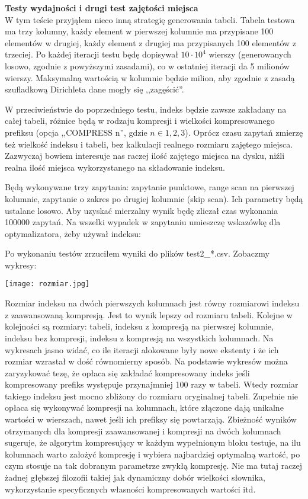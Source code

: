 \documentclass[a4paper,11pt]{article}
\begin{document}
{\bf Testy wydajności i drugi test zajętości miejsca} \\

W tym teście przyjąłem nieco inną strategię generowania tabeli. Tabela testowa ma trzy kolumny, każdy element w pierwszej kolumnie ma przypisane 100 elementów w drugiej, każdy element z drugiej ma przypisanych 100 elementów z trzeciej. Po każdej iteracji testu będę dopisywał $10 \cdot 10^4$ wierszy (generowanych losowo, zgodnie z powyższymi zasadami), co w ostatniej iteracji da 5 milionów wierszy. Maksymalną wartością w kolumnie będzie milion, aby zgodnie z zasadą szufladkową Dirichleta dane mogły się ,,zagęścić''.

W przeciwieństwie do poprzedniego testu, indeks będzie zawsze zakładany na całej tabeli, różnice będą w rodzaju kompresji i wielkości kompresowanego prefiksu (opcja ,,COMPRESS n'', gdzie $n \in {1, 2, 3}$). Oprócz czasu zapytań
zmierzę też wielkość indeksu i tabeli, bez kalkulacji realnego rozmiaru zajętego miejsca. Zazwyczaj bowiem interesuje nas raczej ilość zajętego miejsca na dysku, niźli realna ilość miejsca wykorzystanego na składowanie indeksu.

Będą wykonywane trzy zapytania: zapytanie punktowe, range scan na pierwszej kolumnie, zapytanie o zakres po drugiej kolumnie (skip scan). Ich parametry będą ustalane losowo. Aby uzyskać mierzalny wynik będę zliczał czas wykonania 100000 zapytań. Na wszelki wypadek w zapytaniu umieszczę wskazówkę dla optymalizatora, żeby używał indeksu:


Po wykonaniu testów zrzuciłem wyniki do plików test2\_*.csv. Zobaczmy wykresy:

\texttt{[image: rozmiar.jpg]}

Rozmiar indeksu na dwóch pierwszych kolumnach jest równy rozmiarowi indeksu z zaawansowaną kompresją. Jest to wynik
lepszy od rozmiaru tabeli. Kolejne w kolejności są rozmiary: tabeli, indeksu z kompresją na pierwszej kolumnie,
indeksu bez kompresji, indeksu z kompresją na wszystkich kolumnach. Na wykresach jasno widać, co ile iteracji alokowane były nowe ekstenty i że ich rozmiar wzrastał w dość równomierny sposób.
Na podstawie wykresów można zaryzykować tezę, że opłaca się zakładać kompresowany indeks jeśli kompresowany prefiks
występuje przynajmniej 100 razy w tabeli. Wtedy rozmiar takiego indeksu jest mocno zbliżony do rozmiaru oryginalnej tabeli. Zupełnie nie opłaca się wykonywać kompresji na kolumnach, które złączone dają unikalne wartości w wierszach, nawet jeśli ich prefiksy się powtarzają. Zbieżność wyników otrzymanych dla kompresji zaawansowanej i kompresji na
dwóch kolumnach sugeruje, że algorytm kompresujący w każdym wypełnionym bloku testuje, na ilu kolumnach warto
założyć kompresję i wybiera najbardziej optymalną wartość, po czym stosuje na tak dobranym parametrze zwykłą kompresję. Nie ma tutaj raczej żadnej głębszej filozofii takiej jak
dynamiczny dobór wielkości słownika, wykorzystanie specyficznych własności kompresowanych wartości itd.
\end{document}
